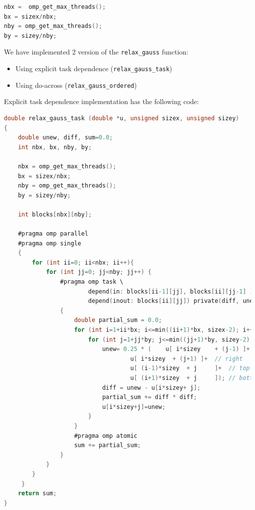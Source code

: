 \documentclass[titlepage]{article}
\newcommand{\incode}[1]{\lstinline[style=inlineC,language=C]{#1}}
\begin{document}
\begin{lstlisting}[style=c, language=C, caption=OpenMP Tiled Gauss-Seidel, captionpos=b]      
nbx =  omp_get_max_threads();                        
bx = sizex/nbx;                                      
nby = omp_get_max_threads();                         
by = sizey/nby;
\end{lstlisting}

We have implemented 2 version of the \incode{relax_gauss} function:

\begin{itemize}
    \item Using explicit task dependence (\incode{relax_gauss_task})
    \item Using do-across (\incode{relax_gauss_ordered})
\end{itemize}

Explicit task dependence implementation has the following code:

\begin{lstlisting}[style=c, language=C, caption=OpenMP Gauss-Seidel with explicit task dependence, captionpos=b] 
double relax_gauss_task (double *u, unsigned sizex, unsigned sizey)
{
    double unew, diff, sum=0.0;
    int nbx, bx, nby, by;

    nbx = omp_get_max_threads(); 
    bx = sizex/nbx;
    nby = omp_get_max_threads(); 
    by = sizey/nby;

    int blocks[nbx][nby];

    #pragma omp parallel 
    #pragma omp single
    {
        for (int ii=0; ii<nbx; ii++){
            for (int jj=0; jj<nby; jj++) {
                #pragma omp task \
                        depend(in: blocks[ii-1][jj], blocks[ii][jj-1] ) \
                        depend(inout: blocks[ii][jj]) private(diff, unew) 
                {
                    double partial_sum = 0.0;
                    for (int i=1+ii*bx; i<=min((ii+1)*bx, sizex-2); i++){
                        for (int j=1+jj*by; j<=min((jj+1)*by, sizey-2); j++) {
                            unew= 0.25 * (    u[ i*sizey	+ (j-1) ]+  // left
                                    u[ i*sizey	+ (j+1) ]+  // right
                                    u[ (i-1)*sizey	+ j     ]+  // top
                                    u[ (i+1)*sizey	+ j     ]); // bottom
                            diff = unew - u[i*sizey+ j];
                            partial_sum += diff * diff; 
                            u[i*sizey+j]=unew;
                        }
                    }
                    #pragma omp atomic
                    sum += partial_sum;
                }
            }
        }
     }
    return sum;
}
\end{lstlisting}
\end{document}
